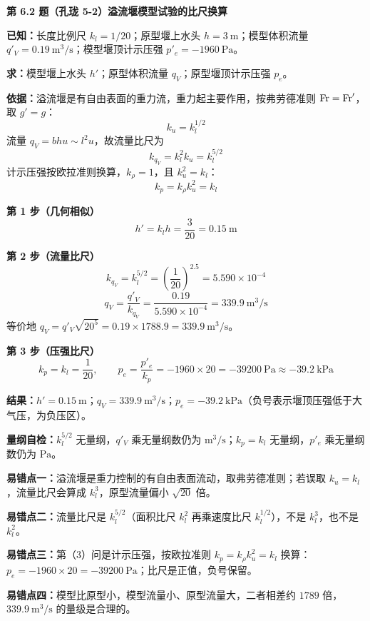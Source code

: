 \noindent\textbf{第 6.2 题（孔珑 5-2）\quad 溢流堰模型试验的比尺换算}

\begin{jie}
\textbf{已知：}长度比例尺 $k_l=1/20$；原型堰上水头 $h=3\ \mathrm{m}$；模型体积流量 $q'_V=0.19\ \mathrm{m^3/s}$；模型堰顶计示压强 $p'_e=-1960\ \mathrm{Pa}$。

\textbf{求：}模型堰上水头 $h'$；原型体积流量 $q_V$；原型堰顶计示压强 $p_e$。

\textbf{依据：}溢流堰是有自由表面的重力流，重力起主要作用，按弗劳德准则 $\mathrm{Fr}=\mathrm{Fr}'$，取 $g'=g$：
\[k_u=k_l^{1/2}\]
流量 $q_V=bhu\sim l^{2}u$，故流量比尺为
\[k_{q_V}=k_l^{2}k_u=k_l^{5/2}\]
计示压强按欧拉准则换算，$k_\rho=1$，且 $k_u^{2}=k_l$：
\[k_p=k_\rho k_u^{2}=k_l\]

\textbf{第 1 步（几何相似）}\quad
\[h'=k_l h=\frac{3}{20}=0.15\ \mathrm{m}\]

\textbf{第 2 步（流量比尺）}\quad
\[k_{q_V}=k_l^{5/2}=\left(\frac{1}{20}\right)^{2.5}=5.590\times10^{-4}\]
\[q_V=\frac{q'_V}{k_{q_V}}=\frac{0.19}{5.590\times10^{-4}}=339.9\ \mathrm{m^3/s}\]
等价地 $q_V=q'_V\sqrt{20^{5}}=0.19\times1788.9=339.9\ \mathrm{m^3/s}$。

\textbf{第 3 步（压强比尺）}\quad
\[k_p=k_l=\frac{1}{20},\qquad p_e=\frac{p'_e}{k_p}=-1960\times20=-39200\ \mathrm{Pa}\approx-39.2\ \mathrm{kPa}\]

\textbf{结果：}$h'=0.15\ \mathrm{m}$；$q_V=339.9\ \mathrm{m^3/s}$；$p_e=-39.2\ \mathrm{kPa}$（负号表示堰顶压强低于大气压，为负压区）。

\textbf{量纲自检：}$k_l^{5/2}$ 无量纲，$q'_V$ 乘无量纲数仍为 $\mathrm{m^3/s}$；$k_p=k_l$ 无量纲，$p'_e$ 乘无量纲数仍为 $\mathrm{Pa}$。
\end{jie}

\begin{yicuo}
\textbf{易错点一：}溢流堰是重力控制的有自由表面流动，取弗劳德准则；若误取 $k_u=k_l$，流量比尺会算成 $k_l^{3}$，原型流量偏小 $\sqrt{20}$ 倍。

\textbf{易错点二：}流量比尺是 $k_l^{5/2}$（面积比尺 $k_l^{2}$ 再乘速度比尺 $k_l^{1/2}$），不是 $k_l^{3}$，也不是 $k_l^{2}$。

\textbf{易错点三：}第（3）问是计示压强，按欧拉准则 $k_p=k_\rho k_u^{2}=k_l$ 换算：$p_e=-1960\times20=-39200\ \mathrm{Pa}$；比尺是正值，负号保留。

\textbf{易错点四：}模型比原型小，模型流量小、原型流量大，二者相差约 $1789$ 倍，$339.9\ \mathrm{m^3/s}$ 的量级是合理的。
\end{yicuo}

